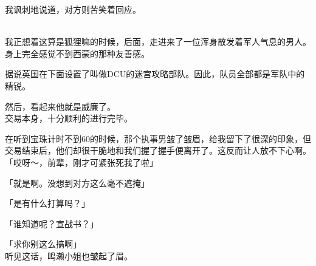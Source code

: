 我讽刺地说道，对方则苦笑着回应。\\


\\

我正想着这算是狐狸嘛的时候，后面，走进来了一位浑身散发着军人气息的男人。身上完全感觉不到西蒙的那种友善感。

据说英国在下面设置了叫做DCU的迷宫攻略部队。因此，队员全部都是军队中的精锐。

然后，看起来他就是威廉了。\\

交易本身，十分顺利的进行完毕。

在听到宝珠计时不到60的时候，那个执事男皱了皱眉，给我留下了很深的印象，但交易结束后，他们却很干脆地和我们握了握手便离开了。这反而让人放不下心啊。\\

「哎呀～，前辈，刚才可紧张死我了啦」

「就是啊。没想到对方这么毫不遮掩」

「是有什么打算吗？」

「谁知道呢？宣战书？」

「求你别这么搞啊」\\

听见这话，鸣濑小姐也皱起了眉。\\

